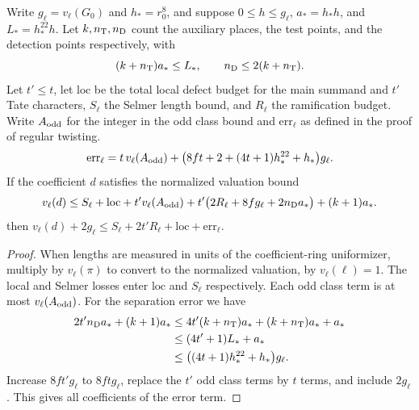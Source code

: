\begin{lemma}
\label{lem:c-ribet-valuation-budget}
\emitthmsource
Write $g_\ell=v_\ell(G_0)$ and $h_*=r_0^8$, and suppose $0\le h\le g_\ell$, $a_*=h_*h$, and $L_*=h_*^{22}h$.
Let $k,n_{\rm T},n_{\rm D}$ count the auxiliary places, the test points, and the detection points respectively, with
\[
 (k+n_{\rm T})a_*\le L_*,
 \qquad n_{\rm D}\le2(k+n_{\rm T}).
\]
Let $t'\le t$, let $\mathrm{loc}$ be the total local defect budget for the main summand and $t'$ Tate characters, $S_\ell$ the Selmer length bound, and $R_\ell$ the ramification budget.
Write $A_{\rm odd}$ for the integer in the odd class bound and $\mathrm{err}_\ell$ as defined in the proof of regular twisting.
\[
 \mathrm{err}_\ell=t\,v_\ell(A_{\rm odd})+
   \bigl(8ft+2+(4t+1)h_*^{22}+h_*\bigr)g_\ell.
\]
If the coefficient $d$ satisfies the normalized valuation bound
\[
 v_\ell(d)\le S_\ell+\mathrm{loc}
      +t'v_\ell(A_{\rm odd})
      +t'\bigl(2R_\ell+8f g_\ell+2n_{\rm D}a_*\bigr)
      +(k+1)a_* .
\]
then $v_\ell(d)+2g_\ell\le S_\ell+2t' R_\ell+\mathrm{loc}+\mathrm{err}_\ell$.
\end{lemma}
\begin{proof}
When lengths are measured in units of the coefficient-ring uniformizer, multiply by $v_\ell(\pi)$ to convert to the normalized valuation, by $v_\ell(\ell)=1$.
The local and Selmer losses enter $\mathrm{loc}$ and $S_\ell$ respectively. Each odd class term is at most $v_\ell(A_{\rm odd})$.
For the separation error we have
\[
 \begin{aligned}
 2t'n_{\rm D}a_*+(k+1)a_*
 &\le4t'(k+n_{\rm T})a_*+(k+n_{\rm T})a_*+a_*\\
 &\le(4t'+1)L_*+a_*\\
 &\le\bigl((4t+1)h_*^{22}+h_*\bigr)g_\ell .
 \end{aligned}
\]
Increase $8ft' g_\ell$ to $8ft g_\ell$, replace the $t'$ odd class terms by $t$ terms, and include $2g_\ell$. This gives all coefficients of the error term.
\end{proof}

